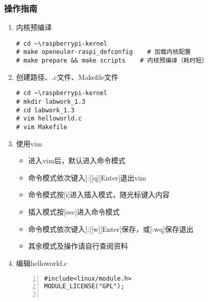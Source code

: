 \documentclass{article}
\begin{document}
\subsubsection{操作指南}
\begin{enumerate}
    \item 内核预编译
\begin{lstlisting}
# cd ~\raspberrypi-kernel
# make openeuler-raspi_defconfig    # 加载内核配置
# make prepare && make scripts    # 内核预编译（耗时短）
\end{lstlisting}
    \item 创建路径、.c文件、Makefile文件
\begin{lstlisting}
# cd ~\raspberrypi-kernel
# mkdir labwork_1.3
# cd labwork_1.3
# vim helloworld.c
# vim Makefile
\end{lstlisting}
    \item 使用vim
    \begin{itemize}
        \item 进入vim后，默认进入命令模式
        \item 命令模式依次键入[:][q][Enter]退出vim
        \item 命令模式按[i]进入插入模式，随光标键入内容
        \item 插入模式按[esc]进入命令模式
        \item 命令模式依次键入[:][w][Enter]保存，或[:wq]保存退出
        \item 其余模式及操作请自行查阅资料
    \end{itemize}
    \item 编辑helloworld.c
\begin{lstlisting}[numbers=left]
#include<linux/module.h>
MODULE_LICENSE("GPL");


\end{lstlisting}
\end{enumerate}
\end{document}

